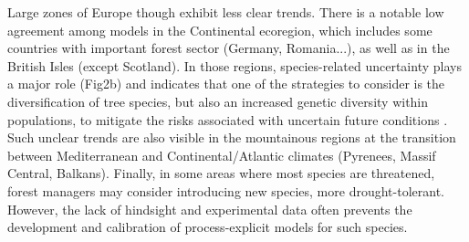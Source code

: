 \documentclass[letterpaper,8pt]{extarticle}  %
\begin{document}
\begin{doublespacing}
\begin{linenumbers}
Large zones of Europe though exhibit less clear trends. There is a notable low agreement among models in the Continental ecoregion, which includes some countries with important forest sector (Germany, Romania...), as well as in the British Isles (except Scotland). In those regions, species-related uncertainty plays a major role (Fig2b) and indicates that one of the strategies to consider is the diversification of tree species, but also an increased genetic diversity within populations, to mitigate the risks associated with uncertain future conditions \citep{Morin2014, Ammer2019, Pretzsch2021, Vospernik2024}. Such unclear trends are also visible in the mountainous regions at the transition between Mediterranean and Continental/Atlantic climates (Pyrenees, Massif Central, Balkans). Finally, in some areas where most species are threatened, forest managers may consider introducing new species, more drought-tolerant. However, the lack of hindsight and experimental data often prevents the development and calibration of process-explicit models for such species.


\end{linenumbers}
\end{doublespacing}
\end{document}

